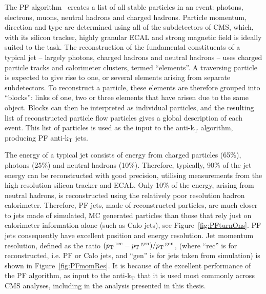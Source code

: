 The \ac{PF} algorithm~\cite{PFT-09-001} creates a list of all stable particles in an event: photons, electrons, muons, neutral hadrons and charged hadrons.
Particle momentum, direction and type are determined using all of the subdetectors of \ac{CMS}, 
which, with its silicon tracker, highly granular \ac{ECAL} and strong magnetic field is ideally suited to the task.
The reconstruction of the fundamental constituents of a typical jet -- largely photons, charged hadrons and neutral hadrons -- uses charged particle tracks and calorimeter clusters, termed ``elements''.
A traversing particle is expected to give rise to one, or several elements arising from separate subdetectors. 
To reconstruct a particle, these elements are therefore grouped into ``blocks'': links of one, two or three elements
that have arisen due to the same object.
Blocks can then be interpreted as individual particles, and the resulting list of reconstructed particle flow particles 
gives a global description of each event.
This list of particles is used as the input to the anti-k$_{\mathrm{T}}$ algorithm, producing \ac{PF} anti-k$_{\mathrm{T}}$ jets.

The energy of a typical jet consists of energy from charged particles (65\%), photons (25\%) and neutral hadrons (10\%).
Therefore, typically, 90\% of the jet energy can be reconstructed with good precision, utilising measurements from the high resolution silicon tracker and \ac{ECAL}. 
Only 10\% of the energy, arising from neutral hadrons, is reconstructed using the relatively poor resolution hadron calorimeter. 
Therefore, \ac{PF} jets, made of reconstructed particles, are much closer to jets made of simulated, \ac{MC} generated particles than those that rely just on calorimeter information alone (such as Calo jets), see Figure~\ref{fig:PFturnOns}.
\ac{PF} jets consequently have excellent position and energy resolution. 
Jet momentum resolution, defined as the ratio $(p_{\text{T}}\,^{\mathrm{rec}} - p_{\text{T}}\,^{\mathrm{gen}})/p_{\text{T}}\,^{\mathrm{gen}}$, (where ``rec'' is for reconstructed, i.e. \ac{PF} or Calo jets, and ``gen'' is for jets taken from simulation) 
is shown in Figure~\ref{fig:PFmomRes}.
It is because of the excellent performance of the \ac{PF} algorithm, as input to the anti-k$_{\mathrm{T}}$ that it is used most commonly across \ac{CMS} analyses, including in the analysis presented in this thesis.

